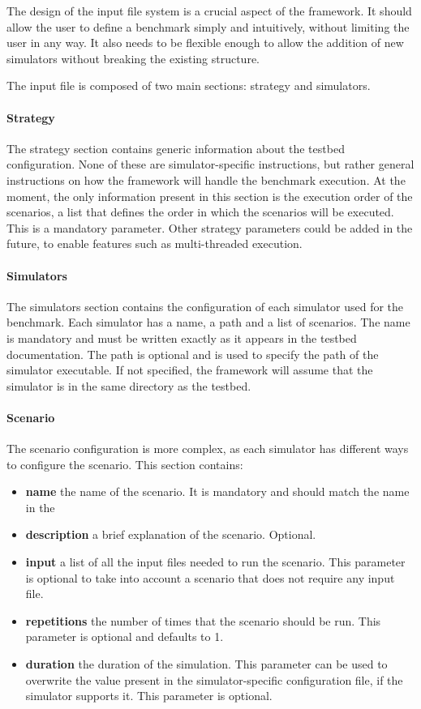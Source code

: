 \documentclass[12pt,a4paper,openright,twoside]{book}
\begin{document}
The design of the input file system is a crucial aspect of the framework.
It should allow the user to define a benchmark simply and intuitively, without limiting the user in any way.
It also needs to be flexible enough to allow the addition of new simulators without breaking the existing structure.

The input file is composed of two main sections: strategy and simulators.

\paragraph*{Strategy}
The strategy section contains generic information about the testbed configuration.
None of these are simulator-specific instructions, but rather general instructions on how the framework will handle the benchmark execution.
At the moment, the only information present in this section is the execution order of the scenarios,
a list that defines the order in which the scenarios will be executed. This is a mandatory parameter.
Other strategy parameters could be added in the future, to enable features such as multi-threaded execution.

\paragraph*{Simulators}
The simulators section contains the configuration of each simulator used for the benchmark.
Each simulator has a name, a path and a list of scenarios.
The name is mandatory and must be written exactly as it appears in the testbed documentation.
The path is optional and is used to specify the path of the simulator executable.
If not specified, the framework will assume that the simulator is in the same directory as the testbed.

\paragraph*{Scenario}
The scenario configuration is more complex, as each simulator has different ways to configure the scenario.
This section contains:
\begin{itemize}
  \item \textbf{name} the name of the scenario. It is mandatory and should match the name in the
  \item \textbf{description} a brief explanation of the scenario. Optional.
  \item \textbf{input} a list of all the input files needed to run the scenario. This parameter is optional to take into account a scenario that does not require any input file.
  \item \textbf{repetitions} the number of times that the scenario should be run. This parameter is optional and defaults to 1.
  \item \textbf{duration} the duration of the simulation. This parameter can be used to overwrite the value present in the simulator-specific configuration file, if the simulator supports it. This parameter is optional.
\end{itemize}
\end{document}
